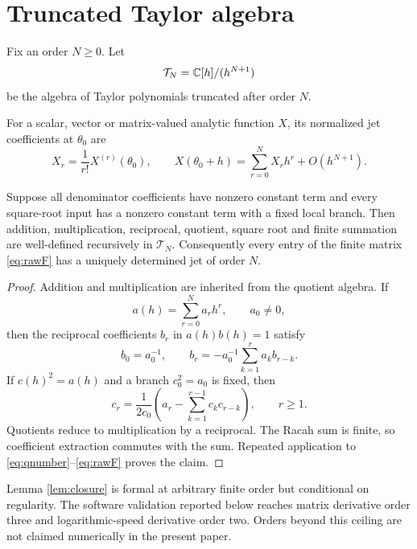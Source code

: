 \section{Truncated Taylor algebra}
Fix an order $N\ge0$.  Let
\begin{equation}
\mathcal T_N=\mathbb C[h]/(h^{N+1})
\label{eq:TN}
\end{equation}
be the algebra of Taylor polynomials truncated after order $N$.

\begin{definition}
For a scalar, vector or matrix-valued analytic function $X$, its normalized jet coefficients at $\theta_0$ are
\begin{equation}
X_r=\frac{1}{r!}X^{(r)}(\theta_0),
\qquad
X(\theta_0+h)=\sum_{r=0}^{N}X_r h^r+O(h^{N+1}).
\label{eq:jetconvention}
\end{equation}
\end{definition}

\begin{lemma}
\label{lem:closure}
Suppose all denominator coefficients have nonzero constant term and every square-root input has a nonzero constant term with a fixed local branch.  Then addition, multiplication, reciprocal, quotient, square root and finite summation are well-defined recursively in $\mathcal T_N$.  Consequently every entry of the finite matrix \eqref{eq:rawF} has a uniquely determined jet of order $N$.
\end{lemma}

\begin{proof}
Addition and multiplication are inherited from the quotient algebra.  If
\[
a(h)=\sum_{r=0}^{N}a_rh^r,
\qquad a_0\ne0,
\]
then the reciprocal coefficients $b_r$ in $a(h)b(h)=1$ satisfy
\begin{equation}
b_0=a_0^{-1},
\qquad
b_r=-a_0^{-1}\sum_{k=1}^{r}a_kb_{r-k}.
\label{eq:reciprocal}
\end{equation}
If $c(h)^2=a(h)$ and a branch $c_0^2=a_0$ is fixed, then
\begin{equation}
c_r=\frac{1}{2c_0}
\left(a_r-\sum_{k=1}^{r-1}c_kc_{r-k}\right),
\qquad r\ge1.
\label{eq:sqrtrecurrence}
\end{equation}
Quotients reduce to multiplication by a reciprocal.  The Racah sum is finite, so coefficient extraction commutes with the sum.  Repeated application to \eqref{eq:qnumber}--\eqref{eq:rawF} proves the claim.
\end{proof}

\begin{remark}
Lemma \ref{lem:closure} is formal at arbitrary finite order but conditional on regularity.  The software validation reported below reaches matrix derivative order three and logarithmic-speed derivative order two.  Orders beyond this ceiling are not claimed numerically in the present paper.
\end{remark}

